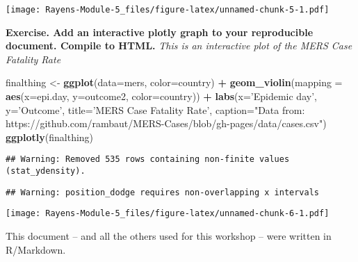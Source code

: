 \documentclass[]{article}
\newenvironment{Shaded}{\begin{snugshade}}{\end{snugshade}}
\newcommand{\DataTypeTok}[1]{\textcolor[rgb]{0.13,0.29,0.53}{#1}}
\newcommand{\KeywordTok}[1]{\textcolor[rgb]{0.13,0.29,0.53}{\textbf{#1}}}
\newcommand{\NormalTok}[1]{#1}
\newcommand{\OperatorTok}[1]{\textcolor[rgb]{0.81,0.36,0.00}{\textbf{#1}}}
\newcommand{\StringTok}[1]{\textcolor[rgb]{0.31,0.60,0.02}{#1}}
\begin{document}
\texttt{[image: Rayens-Module-5\_files/figure-latex/unnamed-chunk-5-1.pdf]}

\textbf{Exercise. Add an interactive plotly graph to your reproducible
document. Compile to HTML.} \emph{This is an interactive plot of the
MERS Case Fatality Rate}

\begin{Shaded}
\begin{Highlighting}[]
\NormalTok{finalthing <-}\StringTok{ }\KeywordTok{ggplot}\NormalTok{(}\DataTypeTok{data=}\NormalTok{mers, }\DataTypeTok{color=}\NormalTok{country) }\OperatorTok{+}\StringTok{ }
\StringTok{  }\KeywordTok{geom_violin}\NormalTok{(}\DataTypeTok{mapping =} \KeywordTok{aes}\NormalTok{(}\DataTypeTok{x=}\NormalTok{epi.day, }\DataTypeTok{y=}\NormalTok{outcome2, }\DataTypeTok{color=}\NormalTok{country)) }\OperatorTok{+}
\StringTok{   }\KeywordTok{labs}\NormalTok{(}\DataTypeTok{x=}\StringTok{'Epidemic day'}\NormalTok{, }\DataTypeTok{y=}\StringTok{'Outcome'}\NormalTok{,}
       \DataTypeTok{title=}\StringTok{'MERS Case Fatality Rate'}\NormalTok{, }\DataTypeTok{caption=}\StringTok{"Data from: https://github.com/rambaut/MERS-Cases/blob/gh-pages/data/cases.csv"}\NormalTok{)}
\KeywordTok{ggplotly}\NormalTok{(finalthing)}
\end{Highlighting}
\end{Shaded}

\begin{verbatim}
## Warning: Removed 535 rows containing non-finite values (stat_ydensity).
\end{verbatim}

\begin{verbatim}
## Warning: position_dodge requires non-overlapping x intervals
\end{verbatim}

\texttt{[image: Rayens-Module-5\_files/figure-latex/unnamed-chunk-6-1.pdf]}

This document -- and all the others used for this workshop -- were
written in R/Markdown.
\end{document}
